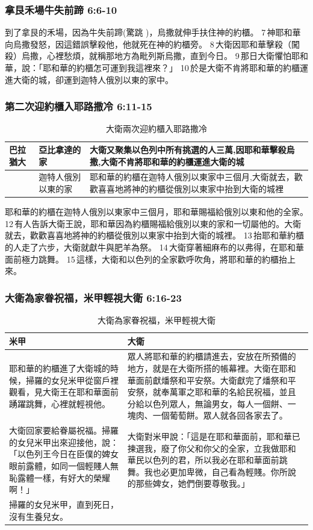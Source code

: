 \subsubsection{拿艮禾場牛失前蹄 6:6-10}
到了拿艮的禾場，因為牛失前蹄(驚跳	)，烏撒就伸手扶住神的約櫃。 7 神耶和華向烏撒發怒，因這錯誤擊殺他，他就死在神的約櫃旁。 8 大衛因耶和華擊殺（闖殺）烏撒，心裡愁煩，就稱那地方為毗列斯烏撒，直到今日。 9 那日大衛懼怕耶和華，說：「耶和華的約櫃怎可運到我這裡來？」 10 於是大衛不肯將耶和華的約櫃運進大衛的城，卻運到迦特人俄別以東的家中。


\subsubsection{第二次迎約櫃入耶路撒冷 6:11-15}
\begin{table}[H]
\centering 
\begin{tabular}{|p{}|p{}|p{}|}
\hline
\hline
巴拉猶大& 亞比拿達的家 &大衛又聚集以色列中所有挑選的人三萬,因耶和華擊殺烏撒,大衛不肯將耶和華的約櫃運進大衛的城\\\hline
 &迦特人俄別以東的家&耶和華的約櫃在迦特人俄別以東家中三個月,大衛就去，歡歡喜喜地將神的約櫃從俄別以東家中抬到大衛的城裡 \\\hline
\end{tabular}
\caption{大衛兩次迎約櫃入耶路撒冷}
\end{table}
耶和華的約櫃在迦特人俄別以東家中三個月，耶和華賜福給俄別以東和他的全家。 12 有人告訴大衛王說，耶和華因為約櫃賜福給俄別以東的家和一切屬他的。大衛就去，歡歡喜喜地將神的約櫃從俄別以東家中抬到大衛的城裡。 13 抬耶和華約櫃的人走了六步，大衛就獻牛與肥羊為祭。 14 大衛穿著細麻布的以弗得，在耶和華面前極力跳舞。 15 這樣，大衛和以色列的全家歡呼吹角，將耶和華的約櫃抬上來。


\subsubsection{大衛為家眷祝福，米甲輕視大衛 6:16-23}
\begin{table}[H]
\centering 
\begin{tabular}{p{6.75cm}|p{10.5cm}}\hline\hline
米甲&大衛\\\hline
耶和華的約櫃進了大衛城的時候，掃羅的女兒米甲從窗戶裡觀看，見大衛王在耶和華面前踴躍跳舞，心裡就輕視他。&眾人將耶和華的約櫃請進去，安放在所預備的地方，就是在大衛所搭的帳幕裡。大衛在耶和華面前獻燔祭和平安祭。大衛獻完了燔祭和平安祭，就奉萬軍之耶和華的名給民祝福，並且分給以色列眾人，無論男女，每人一個餅、一塊肉、一個葡萄餅。眾人就各回各家去了。\\\hline
大衛回家要給眷屬祝福。掃羅的女兒米甲出來迎接他，說：「以色列王今日在臣僕的婢女眼前露體，如同一個輕賤人無恥露體一樣，有好大的榮耀啊！」&大衛對米甲說：「這是在耶和華面前，耶和華已揀選我，廢了你父和你父的全家，立我做耶和華民以色列的君，所以我必在耶和華面前跳舞。我也必更加卑微，自己看為輕賤。你所說的那些婢女，她們倒要尊敬我。」\\\hline
掃羅的女兒米甲，直到死日，沒有生養兒女。&\\\hline
\end{tabular}
\caption{大衛為家眷祝福，米甲輕視大衛}
\end{table}

